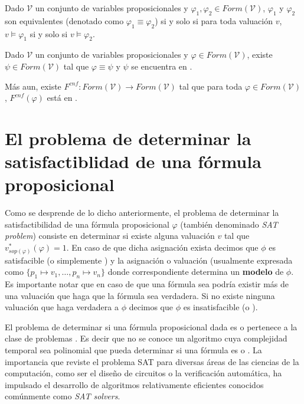 \begin{definition}
Dado $\mathcal{V}$ un conjunto de variables proposicionales y $\varphi_1, \varphi_2 \in \mathit{Form}(\mathcal{V})$, $\varphi_1$ y $\varphi_2$ son equivalentes (denotado como $\varphi_1 \equiv \varphi_2$) si y solo si para toda valuación $v$, $v \models \varphi_1$ si y solo si $v \models \varphi_2$.
\end{definition}

\begin{theorem}\label{th:cnfequiv}
Dado $\mathcal{V}$ un conjunto de variables proposicionales y $\varphi \in \mathit{Form}(\mathcal{V})$, existe $\psi \in \mathit{Form}(\mathcal{V})$ tal que $\varphi \equiv \psi$ y $\psi$ se encuentra en \cnf.

Más aun, existe $F^{\mathit{cnf}}: \mathit{Form}(\mathcal{V}) \to \mathit{Form}(\mathcal{V})$ tal que para toda $\varphi \in \mathit{Form}(\mathcal{V})$, $F^{\mathit{cnf}} (\varphi)$ está en \cnf.
\end{theorem}




\section{El problema de determinar la satisfactiblidad de una fórmula proposicional}

Como se desprende de lo dicho anteriormente, el problema de determinar la satisfactibilidad de una fórmula proposicional $\varphi$ (también denominado \emph{SAT problem}) consiste en determinar si existe alguna valuación $v$ tal que $v_{\mathit{sop}(\varphi)}^*(\varphi) = 1$. En caso de que dicha
asignación exista decimos que $\phi$ es satisfacible (o simplemente \sat) y la
asignación o valuación (usualmente expresada como $\{ p_1 \mapsto v_1, \ldots, p_n \mapsto v_n \}$ donde 
correspondiente determina un \textbf{modelo} de $\phi$. Es importante notar que en caso
de que una fórmula sea \sat podría existir más de una valuación que haga que la
fórmula sea verdadera. Si no existe ninguna valuación que haga verdadera a
$\phi$ decimos que $\phi$ es insatisfacible (o \unsat).

El problema de determinar si una fórmula proposicional dada es \sat o \unsat pertenece
a la clase de problemas \npc\cite{Cook:1971:CTP:800157.805047}. Es decir que no
se conoce un algoritmo cuya complejidad temporal sea polinomial que pueda determinar si una fórmula es \sat
o \unsat. La importancia que reviste el problema SAT para diversas áreas de las
ciencias de la computación, como ser el diseño de circuitos o la verificación
automática, ha impulsado el desarrollo de algoritmos relativamente eficientes
conocidos comúnmente como \emph{SAT solvers}.

